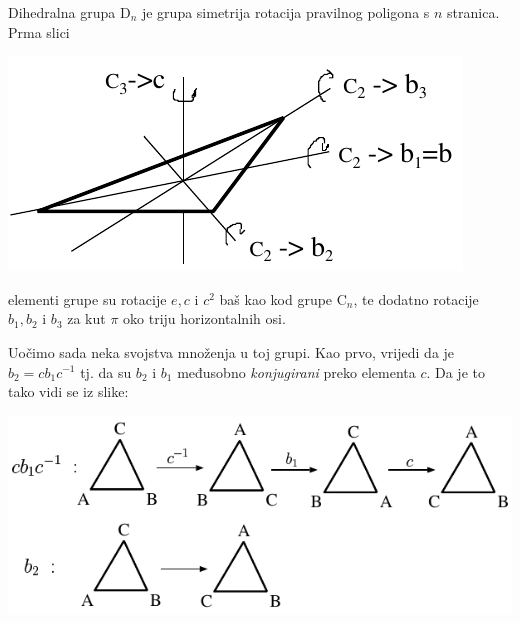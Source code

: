 \begin{primjer}
Dihedralna grupa D$_n$ je grupa simetrija rotacija pravilnog poligona s $n$ stranica.
Prma slici

\centerline{\includegraphics[scale=1.0]{pics/D3}}

elementi grupe su rotacije $e, c$ i  $c^2$ baš kao kod grupe C$_n$, te
dodatno rotacije $b_1, b_2$ i $b_3$ za kut $\pi$ oko triju horizontalnih
osi.

Uočimo sada neka svojstva množenja u toj grupi. Kao prvo, vrijedi
da je $b_2 = c b_1 c^{-1}$ tj. da su $b_2$ i $b_1$ međusobno
\emph{konjugirani} preko elementa $c$. Da je to tako vidi
se iz slike:

\centerline{\includegraphics[scale=1.0]{pics/cbc}}


\end{primjer}
